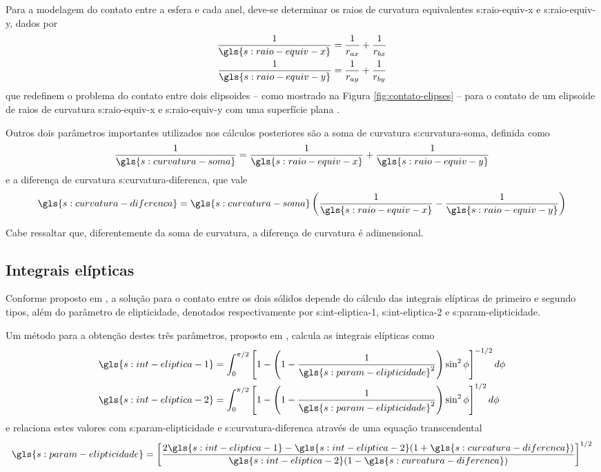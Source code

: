 \documentclass[12pt,oneside,english,brazil,lmodern,siglas,simbolos,cite=num]{ucsmonograph}
\begin{document}
	Para a modelagem do contato entre a esfera e cada anel, deve-se determinar os raios de curvatura equivalentes \gls{s:raio-equiv-x} e \gls{s:raio-equiv-y}, dados por
	\begin{gather}
		\frac{1}{\gls{s:raio-equiv-x}} = \frac{1}{r_{ax}} +
		\frac{1}{r_{bx}} \label{eqn:seco:r-equiv-x} \\
		\frac{1}{\gls{s:raio-equiv-y}} = \frac{1}{r_{ay}} +
		\frac{1}{r_{by}} \label{eqn:seco:r-equiv-y}
	\end{gather}
	que redefinem o problema do contato entre dois elipsoides -- como mostrado na Figura \ref{fig:contato-elipses} -- para o contato de um elipsoide de raios de curvatura \gls{s:raio-equiv-x} e \gls{s:raio-equiv-y} com uma superfície plana \cite{hamrock:1991}.
	
	Outros dois parâmetros importantes utilizados nos cálculos posteriores são a soma de curvatura \gls{s:curvatura-soma}, definida como \cite{wijnant:1998}
	\begin{equation} \label{eqn:seco:curv-soma}
		\frac{1}{\gls{s:curvatura-soma}} =
		\frac{1}{\gls{s:raio-equiv-x}} + \frac{1}{\gls{s:raio-equiv-y}}
	\end{equation}
	e a diferença de curvatura \gls{s:curvatura-diferenca}, que vale
	\begin{equation}
		\gls{s:curvatura-diferenca} = \gls{s:curvatura-soma}
		\left( \frac{1}{\gls{s:raio-equiv-x}} - 
		\frac{1}{\gls{s:raio-equiv-y}} \right)
	\end{equation}
	
	Cabe ressaltar que, diferentemente da soma de curvatura, a diferença de curvatura é adimensional.
	
	\subsection{Integrais elípticas}
	Conforme proposto em \cite{hertz:1881}, a solução para o contato entre os dois sólidos depende do cálculo das integrais elípticas de primeiro e segundo tipos, além do parâmetro de elipticidade, denotados respectivamente por \gls{s:int-eliptica-1}, \gls{s:int-eliptica-2} e \gls{s:param-elipticidade}.
	
	Um método para a obtenção destes três parâmetros, proposto em \cite{hamrock:1991}, calcula as integrais elípticas como
	\begin{align}
		\gls{s:int-eliptica-1} &= \int_{0}^{\pi/2} \left[ 1 - \left( 1-\frac{1}{\gls{s:param-elipticidade}^2}\right)\sin^2\phi
		\right]^{-1/2}d\phi \label{eqn:seco:int-elip-1} \\
		\gls{s:int-eliptica-2} &= \int_{0}^{\pi/2} \left[ 1 - \left(
		1-\frac{1}{\gls{s:param-elipticidade}^2}\right)\sin^2\phi
		\right]^{1/2}d\phi \label{eqn:seco:int-elip-2}
	\end{align}
	e relaciona estes valores com \gls{s:param-elipticidade} e \gls{s:curvatura-diferenca} através de uma equação transcendental
	\begin{equation} \label{eqn:seco:param-elip}
		\gls{s:param-elipticidade} = \left[ \frac{
		2\gls{s:int-eliptica-1} - \gls{s:int-eliptica-2}(
		1+\gls{s:curvatura-diferenca})}{
		\gls{s:int-eliptica-2}(1-\gls{s:curvatura-diferenca})}
		\right]^{1/2}
	\end{equation}
	
\end{document}
